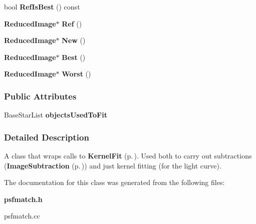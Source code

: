 \begin{CompactItemize}
\item 
{}
bool {\bf Ref\-Is\-Best} () const\label{class_psfmatch_a16}

\item 
{}
{\bf Reduced\-Image}$\ast$ {\bf Ref} ()\label{class_psfmatch_a17}

\item 
{}
{\bf Reduced\-Image}$\ast$ {\bf New} ()\label{class_psfmatch_a18}

\item 
{}
{\bf Reduced\-Image}$\ast$ {\bf Best} ()\label{class_psfmatch_a19}

\item 
{}
{\bf Reduced\-Image}$\ast$ {\bf Worst} ()\label{class_psfmatch_a20}

\end{CompactItemize}
\subsubsection*{Public Attributes}
\begin{CompactItemize}
\item 
{}
Base\-Star\-List {\bf objects\-Used\-To\-Fit}\label{class_psfmatch_m0}

\end{CompactItemize}


\subsubsection{Detailed Description}
A class that wraps calls to {\bf Kernel\-Fit} {\rm (p.\,\pageref{class_kernelfit})}. Used both to carry out subtractions ({\bf Image\-Subtraction} {\rm (p.\,\pageref{class_imagesubtraction})}) and just kernel fitting (for the light curve).



The documentation for this class was generated from the following files:\begin{CompactItemize}
\item 
{\bf psfmatch.h}\item 
psfmatch.cc\end{CompactItemize}
